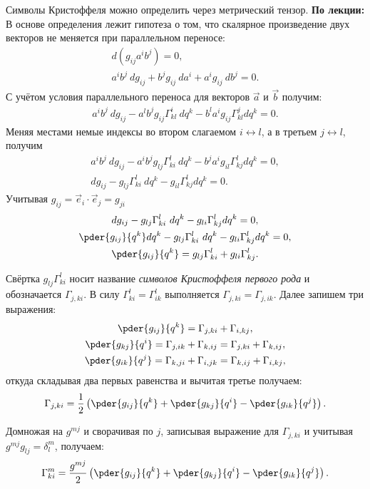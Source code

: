 Символы Кристоффеля можно определить через метрический тензор.
\textbf{По лекции:} В основе определения лежит гипотеза о том, что скалярное
произведение двух векторов не меняется при параллельном переносе:
\begin{gather*}
    d(g_{ij}a^i b^j) = 0, \\
    a^i b^j \ dg_{ij}   + b^j g_{ij}\ da^i + a^i g_{ij}\ db^j = 0.
\end{gather*}
С учётом условия параллельного переноса для векторов \( \vec{a} \) и
\( \vec{b} \) получим:
\begin{gather*}
    a^i b^j \ dg_{ij}   - 
    a^l b^j g_{ij} \Gamma^i_{kl}\ dq^k -
    b^l a^i g_{ij} \Gamma^j_{kl} dq^k = 0.
\end{gather*}
Меняя местами немые индексы во втором слагаемом \( i \leftrightarrow l \),
а в третьем \( j \leftrightarrow l \), получим
\begin{gather*}
    a^i b^j \ dg_{ij}   - 
    a^i b^j g_{lj} \Gamma^l_{ki}\ dq^k -
    b^j a^i g_{il} \Gamma^l_{kj} dq^k = 0, \\
    dg_{ij} - 
    g_{lj} \Gamma^l_{ki}\ dq^k -
    g_{il} \Gamma^l_{kj} dq^k = 0.
\end{gather*}   
Учитывая \( g_{ij} = \vec{e}_{i} \cdot \vec{e}_{j} = g_{ji} \)
\begin{gather*}
    dg_{ij} - 
    g_{lj} \Gamma^l_{ki}\ dq^k -
    g_{li} \Gamma^l_{kj} dq^k = 0, \\
    \pder{g_{ij}}{q^k} dq^k - 
    g_{lj} \Gamma^l_{ki}\ dq^k -
    g_{li} \Gamma^l_{kj} dq^k = 0, \\
    \pder{g_{ij}}{q^k} =
    g_{lj} \Gamma^l_{ki} +
    g_{li} \Gamma^l_{kj}.
\end{gather*}
    
Свёртка \( g_{lj} \Gamma^l_{ki}  \) носит название \emph{символов Кристоффеля
первого рода} и обозначается \( \Gamma_{j,ki} \). В силу
\( \Gamma^l_{ki} = \Gamma^l_{ik} \) выполняется
\( \Gamma_{j,ki} = \Gamma_{j,ik} \). Далее запишем три выражения:
\begin{gather*}
    \pder{g_{ij}}{q^k} =
    \Gamma_{j,ki} +
    \Gamma_{i,kj}, \\
    \pder{g_{kj}}{q^i} =
    \Gamma_{j,ik} +
    \Gamma_{k,ij} =
    \Gamma_{j,ki} +
    \Gamma_{k,ij},
    \\
    \pder{g_{ik}}{q^j} =
    \Gamma_{k,ji} +
    \Gamma_{i,jk} =
    \Gamma_{k,ij} +
    \Gamma_{i,kj},
\end{gather*}   
откуда складывая два первых равенства и вычитая третье получаем:
\[
    \Gamma_{j,ki} = \frac{1}{2}\left(
    \pder{g_{ij}}{q^k}+
    \pder{g_{kj}}{q^i}-
    \pder{g_{ik}}{q^j}   
    \right).
\]
    
Домножая на \( g^{mj} \) и сворачивая по \( j \), записывая выражение для
\( \Gamma_{j,ki} \) и учитывая \( g^{mj}g_{lj} = \delta^m_l \), получаем:
\[
    \Gamma^m_{ki} = \frac{g^{mj}}{2}\left(
        \pder{g_{ij}}{q^k}+
        \pder{g_{kj}}{q^i}-
        \pder{g_{ik}}{q^j}   
        \right).
\] 
\newpage
